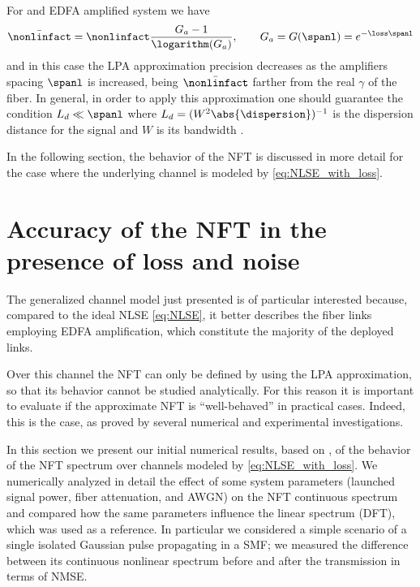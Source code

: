For and \ac{EDFA} amplified system we have
\begin{equation}
  \bar{\nonlinfact} = \nonlinfact \dfrac{G_a - 1}{\logarithm (G_a)}, \qquad
  G_a = G(\spanl) = e^{-\loss \spanl}
\end{equation}
and in this case the \ac{LPA} approximation precision decreases as the amplifiers spacing $\spanl$ is increased, being $\bar{\nonlinfact}$ farther from  the real $\gamma$ of the fiber. In general, in order to apply this approximation one should guarantee the condition $L_d \ll \spanl$ where $L_d = (W^2 \abs{\dispersion})^{-1}$ is the dispersion distance for the signal and $W$ is its bandwidth \cite{hasegawa1995solitons, Turitsyn2017}.

In the following section, the behavior of the \ac{NFT} is discussed in more detail for the case where the underlying channel is modeled by \eqref{eq:NLSE_with_loss}.



\section{Accuracy of the \acl{NFT} in the presence of loss and noise}\label{sec:accuracy_NFT_loss_and_noise}

The generalized channel model just presented is of particular interested because, compared to the ideal \ac{NLSE} \eqref{eq:NLSE}, it better describes the fiber links employing \ac{EDFA} amplification, which constitute the majority of the deployed links.

Over this channel the \ac{NFT} can only be defined by using the \ac{LPA} approximation, so that its behavior cannot be studied analytically. For this reason it is important to evaluate if the approximate \ac{NFT} is ``well-behaved'' in practical cases. Indeed, this is the case, as proved by several numerical \cite{le2015nonlinear,le2015modified} and experimental \cite{le201764, aref2016design} investigations.

In this section we present our initial numerical results, based on \cite{gaiarin2016tolerance}, of the behavior of the \ac{NFT} spectrum over channels modeled by \eqref{eq:NLSE_with_loss}.
We numerically analyzed in detail the effect of some system parameters (launched signal power, fiber attenuation, and \ac{AWGN}) on the \ac{NFT} continuous spectrum and compared how the same parameters influence the linear spectrum (\ac{DFT}), which was used as a reference.
In particular we considered a simple scenario of a single isolated Gaussian pulse
propagating in a \ac{SMF}; we measured the difference between its continuous
nonlinear spectrum before and after the transmission in terms of \ac{NMSE}.

